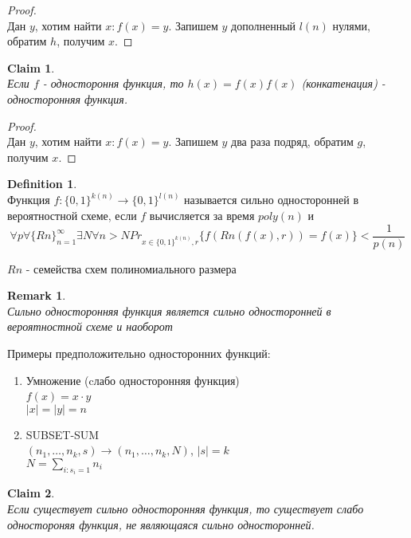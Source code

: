 \documentclass[a4paper]{article}
\theoremstyle{definition}
\newtheorem{definition}{Definition}
\theoremstyle{plain}
\newtheorem{remark}{Remark}
\newtheorem{claim}{Claim}
\begin{document}
\begin{proof}~\\
    Дан $y$, хотим найти $x\colon f(x) = y$. Запишем $y$ дополненный $l(n)$ нулями, обратим $h$, получим $x$.
\end{proof}

\begin{claim}~\\
    Если $f$ - одностороння функция, то $h(x) = f(x)f(x)$ (конкатенация) - односторонняя функция.
\end{claim}

\begin{proof}~\\
    Дан $y$, хотим найти $x\colon f(x) = y$. Запишем $y$ два раза подряд, обратим $g$, получим $x$.
\end{proof}

\begin{definition}~\\
    Функция $f\colon \{0, 1\}^{k(n)} \rightarrow \{0, 1\}^{l(n)}$ называется сильно односторонней в вероятностной схеме, если $f$ вычисляется за время $poly(n)$ и
    $$
        \forall p \forall\{Rn\}_{n = 1}^{\infty} \exists N \forall n > N Pr_{x \in \{0, 1\}^{k(n)}, r}\{f(Rn(f(x), r)) = f(x)\} < \frac{1}{p(n)}
    $$
    
  \noindent $Rn$ - семейства схем полиномиального размера
\end{definition}

\begin{remark}~\\
    Сильно односторонняя функция является сильно односторонней в вероятностной схеме и наоборот
\end{remark}

Примеры предположительно односторонних функций:
\begin{enumerate}
    \item Умножение (cлабо односторонняя функция)~\\
    $f(x) = x \cdot y$~\\
    $|x| = |y| = n$
    \item SUBSET-SUM~\\
    $(n_1,\ldots,n_k, s) \rightarrow (n_1,\ldots,n_k, N)$, $|s| = k$~\\
    $N = \sum_{i\colon s_i = 1}n_i$
\end{enumerate}

\begin{claim}~\\
    Если существует сильно односторонняя функция, то существует слабо одностороняя функция, не являющаяся сильно односторонней.
\end{claim}
\end{document}
